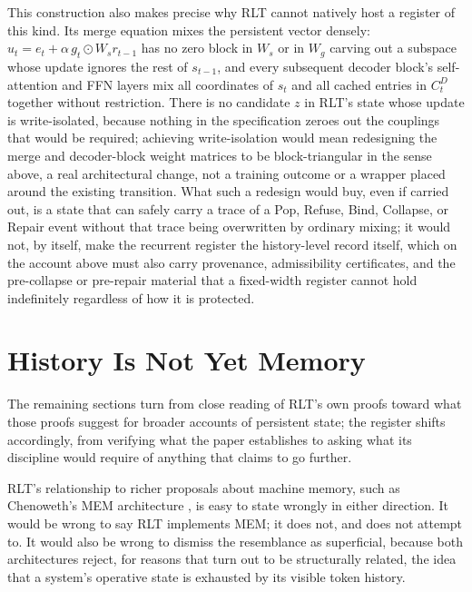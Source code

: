 \documentclass[11pt]{article}
\begin{document}
This construction also makes precise why RLT cannot natively host a register of this kind. Its merge equation mixes the persistent vector densely: $u_t = e_t + \alpha\, g_t \odot W_s r_{t-1}$ has no zero block in $W_s$ or in $W_g$ carving out a subspace whose update ignores the rest of $s_{t-1}$, and every subsequent decoder block's self-attention and FFN layers mix all coordinates of $s_t$ and all cached entries in $C_t^D$ together without restriction. There is no candidate $z$ in RLT's state whose update is write-isolated, because nothing in the specification zeroes out the couplings that would be required; achieving write-isolation would mean redesigning the merge and decoder-block weight matrices to be block-triangular in the sense above, a real architectural change, not a training outcome or a wrapper placed around the existing transition. What such a redesign would buy, even if carried out, is a state that can safely carry a trace of a Pop, Refuse, Bind, Collapse, or Repair event without that trace being overwritten by ordinary mixing; it would not, by itself, make the recurrent register the history-level record itself, which on the account above must also carry provenance, admissibility certificates, and the pre-collapse or pre-repair material that a fixed-width register cannot hold indefinitely regardless of how it is protected.

\section{History Is Not Yet Memory}

The remaining sections turn from close reading of RLT's own proofs toward what those proofs suggest for broader accounts of persistent state; the register shifts accordingly, from verifying what the paper establishes to asking what its discipline would require of anything that claims to go further.

RLT's relationship to richer proposals about machine memory, such as Chenoweth's MEM architecture \cite{chenoweth2025mem8}, is easy to state wrongly in either direction. It would be wrong to say RLT implements MEM; it does not, and does not attempt to. It would also be wrong to dismiss the resemblance as superficial, because both architectures reject, for reasons that turn out to be structurally related, the idea that a system's operative state is exhausted by its visible token history.
\end{document}
